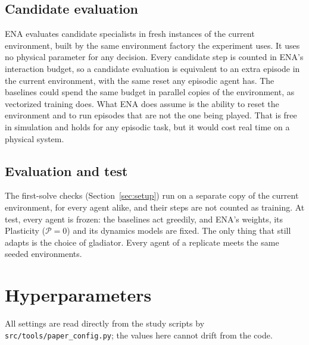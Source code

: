 \subsection{Candidate evaluation}
ENA evaluates candidate specialists in fresh instances of the current environment, built by the same environment factory the experiment uses. It uses no physical parameter for any decision. Every candidate step is counted in ENA's interaction budget, so a candidate evaluation is equivalent to an extra episode in the current environment, with the same reset any episodic agent has. The baselines could spend the same budget in parallel copies of the environment, as vectorized training does. What ENA does assume is the ability to reset the environment and to run episodes that are not the one being played. That is free in simulation and holds for any episodic task, but it would cost real time on a physical system.

\subsection{Evaluation and test}
The first-solve checks (Section~\ref{sec:setup}) run on a separate copy of the current environment, for every agent alike, and their steps are not counted as training. At test, every agent is frozen: the baselines act greedily, and ENA's weights, its Plasticity ($\mathcal{P}=0$) and its dynamics models are fixed. The only thing that still adapts is the choice of gladiator. Every agent of a replicate meets the same seeded environments.

\section{Hyperparameters}
\label{app:hyperparameters}

All settings are read directly from the study scripts by \texttt{src/tools/paper\_config.py}; the values here cannot drift from the code.

